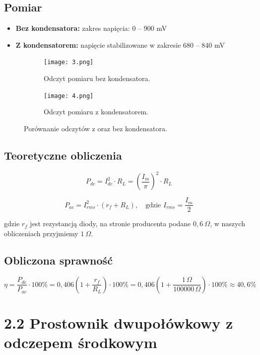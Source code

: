 \documentclass[a4paper,12pt]{article}
\begin{document}
\subsection*{Pomiar}


\begin{itemize}
    \item \textbf{Bez kondensatora:} zakres napięcia: 0 -- 900 mV
    \item \textbf{Z kondensatorem:} napięcie stabilizowane w zakresie 680 -- 840 mV
\end{itemize}
\begin{figure}[h]
    \centering
    \begin{subfigure}{0.45\textwidth}
        \centering
        \texttt{[image: 3.png]}
        \caption{Odczyt pomiaru bez kondensatora.}
        \label{fig:schemat1}
    \end{subfigure}
    \hfill
    \begin{subfigure}{0.45\textwidth}
        \centering
        \texttt{[image: 4.png]}
        \caption{Odczyt pomiaru z kondensatorem.}
        \label{fig:schemat2}
    \end{subfigure}
    \caption{Porównanie odczytów z oraz bez kondensatora.}
    \label{fig:porownanie}
\end{figure}

\subsection*{Teoretyczne obliczenia}
\[
P_{dc} = I_{dc}^2 \cdot R_L = \left( \frac{I_m}{\pi} \right)^2 \cdot R_L
\]

\[
P_{ac} = I_{rms}^2 \cdot (r_f + R_L), \quad \text{gdzie } I_{rms} = \frac{I_m}{2}
\]

gdzie $r_f$ jest rezystancją diody, na stronie producenta podane $0{,}6\ \Omega$, w naszych obliczeniach przyjmiemy $1\ \Omega$.


\subsection*{Obliczona sprawność}

\[
\eta = \frac{P_{dc}}{P_{ac}} \cdot 100\% = 0{,}406 \left( 1 + \frac{r_f}{R_L} \right) \cdot 100\% = 0{,}406 \left( 1 + \frac{1\,\Omega}{100000\,\Omega} \right) \cdot 100\% \approx 40{,}6\%
\]

\section*{2.2 Prostownik dwupołówkowy z odczepem środkowym}
\end{document}
